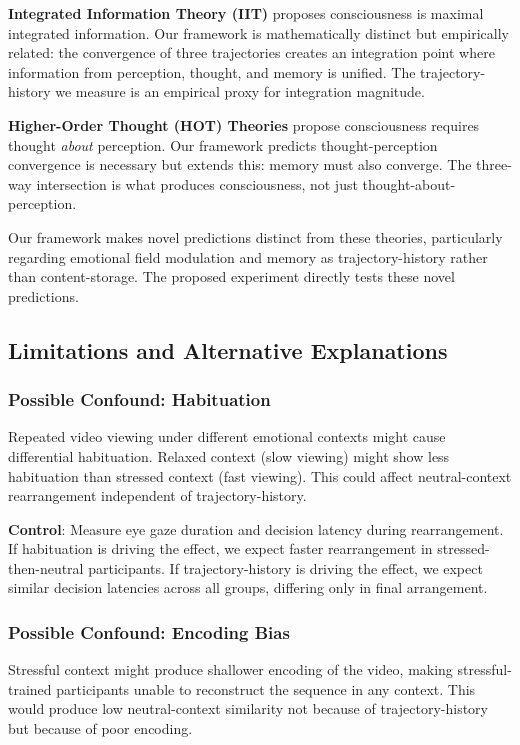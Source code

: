 \documentclass[12pt,a4paper]{article}
\theoremstyle{definition}
\begin{document}
\textbf{Integrated Information Theory (IIT)} \cite{tononi} proposes consciousness is maximal integrated information. Our framework is mathematically distinct but empirically related: the convergence of three trajectories creates an integration point where information from perception, thought, and memory is unified. The trajectory-history we measure is an empirical proxy for integration magnitude.

\textbf{Higher-Order Thought (HOT) Theories} \cite{rosenthal} propose consciousness requires thought \textit{about} perception. Our framework predicts thought-perception convergence is necessary but extends this: memory must also converge. The three-way intersection is what produces consciousness, not just thought-about-perception.

Our framework makes novel predictions distinct from these theories, particularly regarding emotional field modulation and memory as trajectory-history rather than content-storage. The proposed experiment directly tests these novel predictions.

\subsection{Limitations and Alternative Explanations}

\subsubsection{Possible Confound: Habituation}

Repeated video viewing under different emotional contexts might cause differential habituation. Relaxed context (slow viewing) might show less habituation than stressed context (fast viewing). This could affect neutral-context rearrangement independent of trajectory-history.

\textbf{Control}: Measure eye gaze duration and decision latency during rearrangement. If habituation is driving the effect, we expect faster rearrangement in stressed-then-neutral participants. If trajectory-history is driving the effect, we expect similar decision latencies across all groups, differing only in final arrangement.

\subsubsection{Possible Confound: Encoding Bias}

Stressful context might produce shallower encoding of the video, making stressful-trained participants unable to reconstruct the sequence in any context. This would produce low neutral-context similarity not because of trajectory-history but because of poor encoding.
\end{document}
